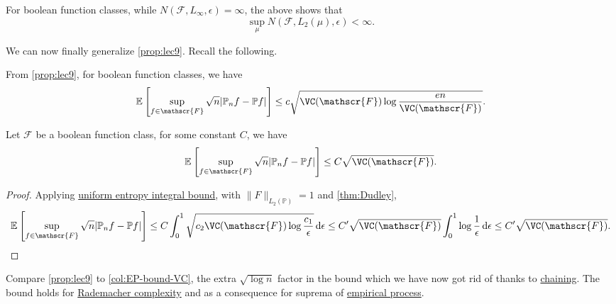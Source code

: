 \begin{remark}
	For boolean function classes, while \(N(\mathscr{F} , L_\infty , \epsilon ) = \infty \), the above shows that
	\[
		\sup _\mu N(\mathscr{F} , L_2(\mu ), \epsilon ) < \infty .
	\]
\end{remark}

We can now finally generalize \autoref{prop:lec9}. Recall the following.

\begin{prev}
	From \autoref{prop:lec9}, for boolean function classes, we have
	\[
		\mathbb{E}_{}\left[\sup _{f\in \mathscr{F} } \sqrt{n} \vert \mathbb{P} _n f - \mathbb{P} f \vert  \right]
		\leq c \sqrt{\VC(\mathscr{F} )\log \frac{en}{\VC(\mathscr{F} )}} .
	\]
\end{prev}

\begin{corollary}\label{col:EP-bound-VC}
	Let \(\mathscr{F} \) be a boolean function class, for some constant \(C\), we have
	\[
		\mathbb{E}_{}\left[\sup _{f\in \mathscr{F} } \sqrt{n} \vert \mathbb{P} _n f - \mathbb{P} f \vert \right]
		\leq C \sqrt{\VC(\mathscr{F} )} .
	\]
\end{corollary}
\begin{proof}
	Applying \hyperref[thm:uniform-entropy-integral-bound]{uniform entropy integral bound}, with \(\lVert F \rVert _{L_2(\mathbb{P} )} = 1\) and \autoref{thm:Dudley},
	\[
		\mathbb{E}_{}\left[\sup _{f\in \mathscr{F} } \sqrt{n} \vert \mathbb{P} _n f - \mathbb{P} f \vert \right]
		\leq C \int_{0}^{1} \sqrt{c_2 \VC(\mathscr{F} ) \log \frac{c_1}{\epsilon }}  \,\mathrm{d}\epsilon
		\leq C^{\prime} \sqrt{\VC(\mathscr{F} )} \int_{0}^{1} \log \frac{1}{\epsilon } \,\mathrm{d}\epsilon
		\leq C^{\prime} \sqrt{\VC(\mathscr{F} )} .
	\]
\end{proof}

\begin{remark}
	Compare \autoref{prop:lec9} to \autoref{col:EP-bound-VC}, the extra \(\sqrt{\log n}\) factor in the bound which we have now got rid of thanks to \hyperref[note:chaining]{chaining}. The bound holds for \hyperref[def:Rademacher-complexity]{Rademacher complexity} and as a consequence for suprema of \hyperref[def:EP]{empirical process}.
\end{remark}

